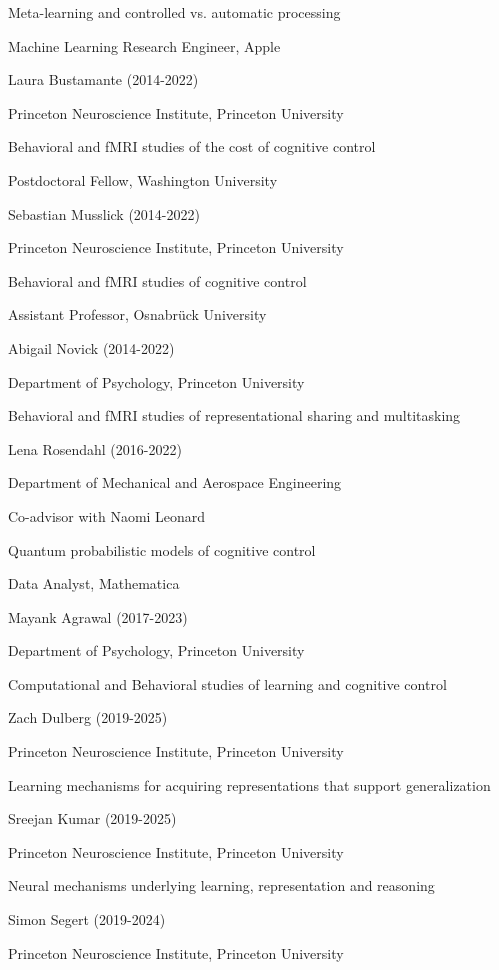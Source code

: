 \documentclass[10 pt]{article}
\begin{document}
Meta-learning and controlled vs. automatic processing

Machine Learning Research Engineer, Apple
    \medskip

Laura Bustamante (2014-2022)

Princeton Neuroscience Institute, Princeton University

Behavioral and fMRI studies of the cost of cognitive control

Postdoctoral Fellow, Washington University
    \medskip

Sebastian Musslick (2014-2022)

Princeton Neuroscience Institute, Princeton University

Behavioral and fMRI studies of cognitive control

Assistant Professor, Osnabrück University
    \medskip

Abigail Novick (2014-2022)

Department of Psychology, Princeton University

Behavioral and fMRI studies of representational sharing and multitasking
    \medskip

Lena Rosendahl (2016-2022)

Department of Mechanical and Aerospace Engineering

Co-advisor with Naomi Leonard

Quantum probabilistic models of cognitive control

Data Analyst, Mathematica
    \medskip

Mayank Agrawal (2017-2023)

Department of Psychology, Princeton University

Computational and Behavioral studies of learning and cognitive control
    \medskip

Zach Dulberg (2019-2025)

Princeton Neuroscience Institute, Princeton University

Learning mechanisms for acquiring representations that support generalization
    \medskip

Sreejan Kumar (2019-2025)

Princeton Neuroscience Institute, Princeton University

Neural mechanisms underlying learning, representation and reasoning
    \medskip

Simon Segert (2019-2024)

Princeton Neuroscience Institute, Princeton University
\end{document}
